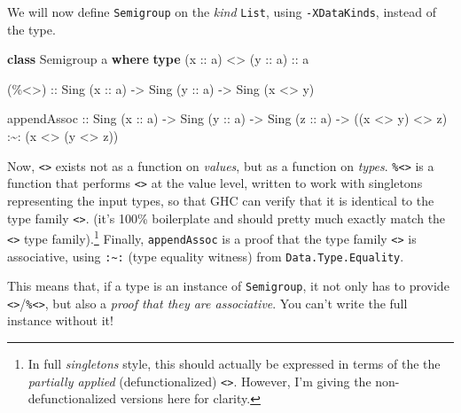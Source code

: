 \documentclass[]{article}
\newenvironment{Shaded}{}{}
\newcommand{\DataTypeTok}[1]{\textcolor[rgb]{0.56,0.13,0.00}{#1}}
\newcommand{\KeywordTok}[1]{\textcolor[rgb]{0.00,0.44,0.13}{\textbf{#1}}}
\newcommand{\NormalTok}[1]{#1}
\newcommand{\OperatorTok}[1]{\textcolor[rgb]{0.40,0.40,0.40}{#1}}
\newcommand{\OtherTok}[1]{\textcolor[rgb]{0.00,0.44,0.13}{#1}}
\begin{document}
We will now define \texttt{Semigroup} on the \emph{kind} \texttt{List}, using
\texttt{-XDataKinds}, instead of the type.

\begin{Shaded}
\begin{Highlighting}[]
\KeywordTok{class} \DataTypeTok{Semigroup}\NormalTok{ a }\KeywordTok{where}
    \KeywordTok{type}\NormalTok{ (}\OtherTok{x ::}\NormalTok{ a) }\OperatorTok{<>}\NormalTok{ (}\OtherTok{y ::}\NormalTok{ a)}\OtherTok{ ::}\NormalTok{ a}

\OtherTok{    (\%<>) ::} \DataTypeTok{Sing}\NormalTok{ (}\OtherTok{x ::}\NormalTok{ a) }\OtherTok{{-}>} \DataTypeTok{Sing}\NormalTok{ (}\OtherTok{y ::}\NormalTok{ a) }\OtherTok{{-}>} \DataTypeTok{Sing}\NormalTok{ (x }\OperatorTok{<>}\NormalTok{ y)}

\NormalTok{    appendAssoc}
\OtherTok{        ::} \DataTypeTok{Sing}\NormalTok{ (}\OtherTok{x ::}\NormalTok{ a)}
        \OtherTok{{-}>} \DataTypeTok{Sing}\NormalTok{ (}\OtherTok{y ::}\NormalTok{ a)}
        \OtherTok{{-}>} \DataTypeTok{Sing}\NormalTok{ (}\OtherTok{z ::}\NormalTok{ a)}
        \OtherTok{{-}>}\NormalTok{ ((x }\OperatorTok{<>}\NormalTok{ y) }\OperatorTok{<>}\NormalTok{ z) }\OperatorTok{:\textasciitilde{}:}\NormalTok{ (x }\OperatorTok{<>}\NormalTok{ (y }\OperatorTok{<>}\NormalTok{ z))}
\end{Highlighting}
\end{Shaded}

Now, \texttt{\textless{}\textgreater{}} exists not as a function on
\emph{values}, but as a function on \emph{types}.
\texttt{\%\textless{}\textgreater{}} is a function that performs
\texttt{\textless{}\textgreater{}} at the value level, written to work with
singletons representing the input types, so that GHC can verify that it is
identical to the type family \texttt{\textless{}\textgreater{}}. (it's 100\%
boilerplate and should pretty much exactly match the
\texttt{\textless{}\textgreater{}} type family).\footnote{In full
  \emph{singletons} style, this should actually be expressed in terms of the the
  \emph{partially applied} (defunctionalized)
  \texttt{\textless{}\textgreater{}}. However, I'm giving the
  non-defunctionalized versions here for clarity.} Finally, \texttt{appendAssoc}
is a proof that the type family \texttt{\textless{}\textgreater{}} is
associative, using \texttt{:\textasciitilde{}:} (type equality witness) from
\texttt{Data.Type.Equality}.

This means that, if a type is an instance of \texttt{Semigroup}, it not only has
to provide
\texttt{\textless{}\textgreater{}}/\texttt{\%\textless{}\textgreater{}}, but
also a \emph{proof that they are associative}. You can't write the full instance
without it!
\end{document}
